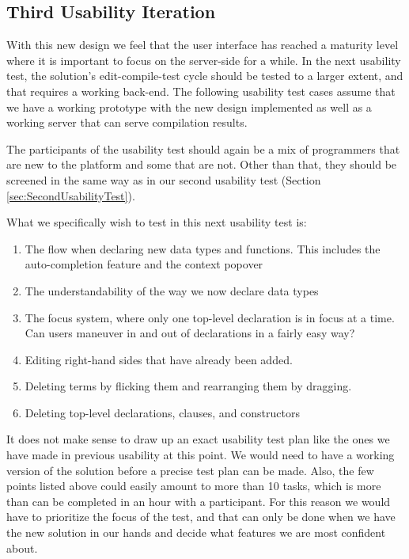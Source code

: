 \subsection{Third Usability Iteration}
\label{subsec:third_usability_test}
With this new design we feel that the user interface has reached a maturity
level where it is important to focus on the server-side for a while. In the
next usability test, the solution's edit-compile-test cycle should be tested to
a larger extent, and that requires a working back-end. The following usability
test cases assume that we have a working prototype with the new design
implemented as well as a working server that can serve compilation results.

The participants of the usability test should again be a mix of programmers
that are new to the platform and some that are not. Other than that, they
should be screened in the same way as in our second usability test (Section
\ref{sec:SecondUsabilityTest}).

What we specifically wish to test in this next usability test is:

\begin{enumerate}
	\item The flow when declaring new data types and functions. This includes the auto-completion feature and the context popover
	\item The understandability of the way we now declare data types
	\item The focus system, where only one top-level declaration is in focus at a
	time. Can users maneuver in and out of declarations in a fairly easy way?
	\item Editing right-hand sides that have already been added.
	\item Deleting terms by flicking them and rearranging them by dragging.
	\item Deleting top-level declarations, clauses, and constructors
\end{enumerate}

It does not make sense to draw up an exact usability test plan like the ones we have made in previous usability
at this point. We would need to have a working version of the solution before a precise test plan can be made. Also, the few points listed above could easily amount to more than 10 tasks, which is more than can be completed in an hour with a participant. For this reason we would have to prioritize the focus of the test, and that can only be done when we have the new solution in our hands and decide what features we are most confident about. 
